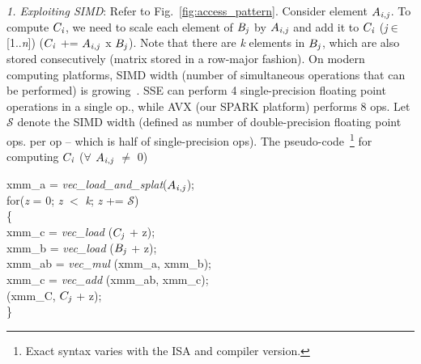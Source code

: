      \vspace*{0.1in}
     {\it{1. Exploiting SIMD}}: Refer to Fig.~\ref{fig:access_pattern}. 
     Consider element $A_{{\it{i}},{\it{j}}}$. To compute
     $C_{\it{i}}$, we need to scale each element of
     $B_{{\it{j}}}$ by  $A_{{\it{i}},{\it{j}}}$ and add it to
     $C_{\it{i}}$ ({\it{j}}$\in$[1..{\it{n}}]) ($C_{\it{i}}$ +=
     $A_{{\it{i}},{\it{j}}}$ x $B_{{\it{j}}}$). Note that there are
     {\it{k}} elements in $B_{{\it{j}}}$, which are also stored
     consecutively (matrix stored in a row-major fashion).
     On modern computing platforms, SIMD width (number of simultaneous
     operations that can be performed) is
     growing~\cite{intel1,intel2}. SSE can perform 4
     single-precision floating point operations in a single op., while
     AVX (our SPARK platform) performs 8 ops. Let $\mathcal{S}$ denote the SIMD width
     (defined as number of double-precision floating point ops. per op
     -- which is half of single-precision ops).
     The pseudo-code~\footnote{Exact syntax varies with the ISA and
     compiler version.} for computing $C_{\it{i}}$ ($\forall$ $A_{{\it{i}},{\it{j}}}$ $\neq$ 0)
     \vspace*{0.05in}

     \hspace*{-0.0in}xmm\_a = {\it{vec\_load\_and\_splat}}($A_{{\it{i}},{\it{j}}}$); \\
     for\hspace*{0.02in}({\it{z}} = 0; {\it{z}} $<$ {\it{k}}; {\it{z}} += $\mathcal{S}$)\\
     \{\\
         \hspace*{0.2in}xmm\_c = {\it{vec\_load}}  ($C_{{\it{j}}}$ + z); \\
         \hspace*{0.2in}xmm\_b = {\it{vec\_load}}  ($B_{{\it{j}}}$ + z); \\
         \hspace*{0.2in}xmm\_ab = {\it{vec\_mul}}  (xmm\_a, xmm\_b); \\
         \hspace*{0.2in}xmm\_c = {\it{vec\_add}}  (xmm\_ab, xmm\_c); \\
          (xmm\_C,  $C_{{\it{j}}}$ + z); \\
     \}\\

